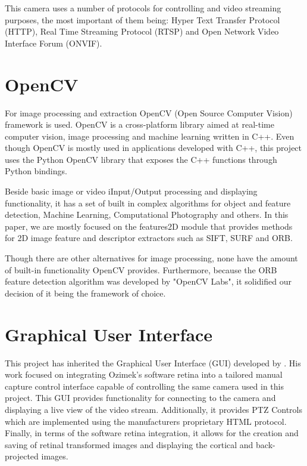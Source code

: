 \documentclass{l4proj}
\begin{document}
This camera uses a number of protocols for controlling and video streaming purposes, the most important of them being: Hyper Text Transfer Protocol (HTTP), Real Time Streaming Protocol (RTSP) and Open Network Video Interface Forum (ONVIF). 


\section{OpenCV}

For image processing and extraction OpenCV (Open Source Computer Vision) framework is used. OpenCV is a cross-platform library aimed at real-time computer vision, image processing and machine learning written in C++. Even though OpenCV is mostly used in applications developed with C++, this project uses the Python OpenCV library that exposes the C++ functions through Python bindings.    

Beside basic image or video iInput/Output processing and displaying functionality, it has a set of built in complex algorithms for object and feature detection, Machine Learning, Computational Photography and others. In this paper, we are mostly focused on the features2D module that provides methods for 2D image feature and descriptor extractors such as SIFT, SURF and ORB.

Though there are other alternatives for image processing, none have the amount of built-in functionality OpenCV provides. Furthermore, because the ORB feature detection algorithm was developed by "OpenCV Labs", it solidified our decision of it being the framework of choice. 

\section{Graphical User Interface} \label{GUIbackground}

This project has inherited the Graphical User Interface (GUI) developed by \cite{JianwenZhou}. His work focused on integrating Ozimek's software retina into a tailored manual capture control interface capable of controlling the same camera used in this project. This GUI provides functionality for connecting to the camera and displaying a live view of the video stream. Additionally, it provides PTZ Controls which are implemented using the manufacturers proprietary HTML protocol. Finally, in terms of the software retina integration, it allows for the creation and saving of retinal transformed images and displaying the cortical and back-projected images.
\end{document}
